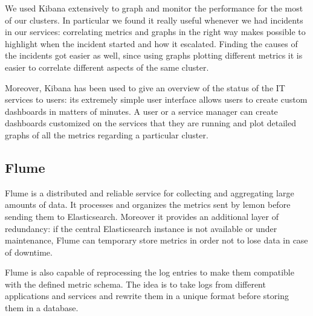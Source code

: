We used Kibana extensively to graph and monitor the performance for the
most of our clusters. In particular we found it really useful whenever we
had incidents in our services: correlating metrics and graphs in the right
way makes possible to highlight when the incident started and how it
escalated. Finding the causes of the incidents got easier as well, since
using graphs plotting different metrics it is easier to correlate
different aspects of the same cluster.

Moreover, Kibana has been used to give an overview of the status of the IT
services to users: its extremely simple user interface allows users to
create custom dashboards in matters of minutes. A user or a service
manager can create dashboards customized on the services that they are
running and plot detailed graphs of all the metrics regarding a particular
cluster.

\subsection{Flume}

Flume is a distributed and reliable service for collecting and aggregating
large amounts of data. It processes and organizes the metrics sent by
lemon before sending them to Elasticsearch. Moreover it provides an
additional layer of redundancy: if the central Elasticsearch instance is
not available or under maintenance, Flume can temporary store metrics in
order not to lose data in case of downtime.

Flume is also capable of reprocessing the log entries to make them
compatible with the defined metric schema. The idea is to take logs from
different applications and services and rewrite them in a unique format
before storing them in a database.
